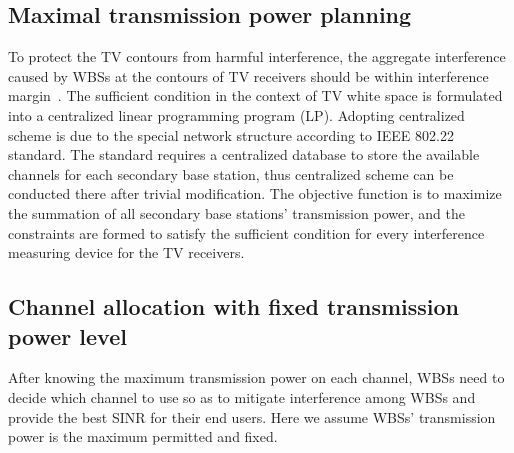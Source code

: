 \subsection{Maximal transmission power planning}
\label{MPowerPlanning}
 
 
To protect the TV contours from harmful interference, the aggregate interference caused by WBSs at the contours of TV receivers should be within interference margin~\cite{multipleIntf_pimrc11}.
The sufficient condition in the context of TV white space is formulated into a centralized linear programming program (\gls{LP}).
Adopting centralized scheme is due to the special network structure according to IEEE 802.22 standard. 
The standard requires a centralized database to store the available channels for each secondary base station, thus centralized scheme can be conducted there after trivial modification.
The objective function is to maximize the summation of all secondary base stations' transmission power, and the constraints are formed to satisfy the sufficient condition for every interference measuring device for the TV receivers. %



\subsection{Channel allocation with fixed transmission power level}
\label{CA}
After knowing the maximum transmission power on each channel, WBSs need to decide which channel to use so as to mitigate interference among WBSs and provide the best SINR for their end users. 
Here we assume WBSs' transmission power is the maximum permitted and fixed.

